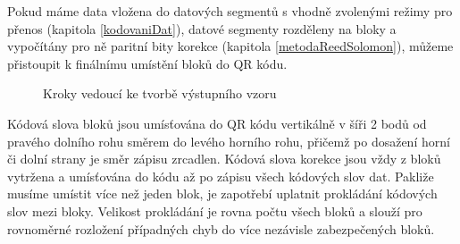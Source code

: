 Pokud máme data vložena do datových segmentů s vhodně zvolenými režimy pro 
přenos (kapitola \ref{kodovaniDat}), datové segmenty rozděleny na bloky a vypočítány pro
ně paritní bity korekce (kapitola \ref{metodaReedSolomon}), můžeme přistoupit k finálnímu
umístění bloků do QR kódu.

\begin{figure}[H]
  \begin{center}
    \caption{Kroky vedoucí ke tvorbě výstupního vzoru}
    \label{CreatingOutputPatternProcess}
  \end{center}
\end{figure}

Kódová slova bloků jsou umísťována do QR kódu vertikálně v šíři 2 bodů od 
pravého dolního rohu směrem do levého horního rohu, přičemž po dosažení 
horní či dolní strany je směr zápisu zrcadlen. Kódová slova korekce jsou 
vždy z bloků vytržena a umísťována do kódu až po zápisu všech kódových 
slov dat. Pakliže musíme umístit více než jeden blok, je zapotřebí uplatnit 
prokládání kódových slov mezi bloky. Velikost prokládání je rovna počtu všech 
bloků a slouží pro rovnoměrné rozložení případných chyb do více nezávisle 
zabezpečených bloků. 

